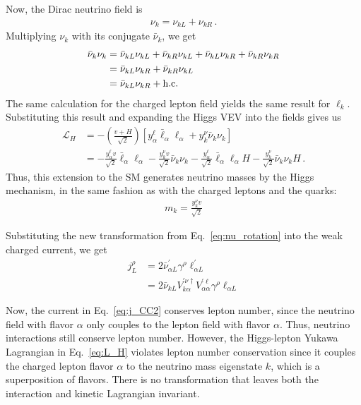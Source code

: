 Now, the Dirac neutrino field is
\begin{align}
    \nu_k = \nu_{kL} + \nu_{kR}\,.
\end{align}
Multiplying $\nu_k$ with its conjugate $\bar{\nu}_k$, we get 
\begin{align}
    \bar{\nu}_k \nu_k 
    & = \bar{\nu}_{k L} \nu_{k L} +\bar{\nu}_{k R}\nu_{k L} + \bar{\nu}_{k L}\nu_{k R} + \bar{\nu}_{k R}\nu_{k R} \nonumber \\
    & = \bar{\nu}_{k L}\nu_{k R} + \bar{\nu}_{k R}\nu_{k L} \nonumber \\
    & = \bar{\nu}_{k L}\nu_{k R} + \text{{h.c.}}
\end{align}
The same calculation for the charged lepton field yields the same result for $\ell_k$. Substituting this result and expanding the Higgs VEV into the fields gives us
\begin{align}
    \mathcal{L}_{H} 
    &=-\left( \frac{v + H}{\sqrt{2}} \right) \left[ y_{\alpha}^{\ell}   \bar{\ell}_\alpha \ell_\alpha  +  y_{k}^{\nu} \bar{\nu}_k \nu_k \right] \nonumber \\
    &=- \frac{y_{\alpha}^{\ell} v}{\sqrt{2}}   \bar{\ell}_\alpha \ell_\alpha   -  \frac{ y_{k}^{\nu} v}{\sqrt{2}} \bar{\nu}_k \nu_k  - \frac{y_{\alpha}^{\ell}}{\sqrt{2}}   \bar{\ell}_\alpha \ell_\alpha H  -  \frac{ y_{k}^{\nu}}{\sqrt{2}} \bar{\nu}_k \nu_k H\,.
\end{align}
Thus, this extension to the SM generates neutrino masses by the Higgs mechanism, in the same fashion as with the charged leptons and the quarks:
\begin{align}
    m_k = \frac{y_k^\nu v}{\sqrt{2}}
\end{align}

Substituting the new transformation from Eq.~\ref{eq:nu_rotation} into the weak charged current, we get
\begin{align}\label{eq:j_CC2}
    j^\rho_L &= 2\bar{\nu}^\prime_{\alpha L} \gamma^\rho \ell_{\alpha L}^\prime \nonumber \\
             &= 2\bar{\nu}_{k L} V^{\prime \nu \dagger}_{k \alpha}V^{\prime \ell}_{\alpha \alpha} \gamma^\rho  \ell_{\alpha L}
\end{align}

Now, the current in Eq.~\ref{eq:j_CC2} conserves lepton number, since the neutrino field with flavor $\alpha$ only couples to the lepton field with flavor $\alpha$. 
Thus, neutrino interactions still conserve lepton number.
However, the Higgs-lepton Yukawa Lagrangian 
in Eq.~\ref{eq:L_H} violates lepton number conservation since it couples the charged lepton flavor $\alpha$ to the neutrino mass eigenstate $k$, which is a superposition of flavors. 
There is no transformation that leaves both the interaction and kinetic Lagrangian invariant.


